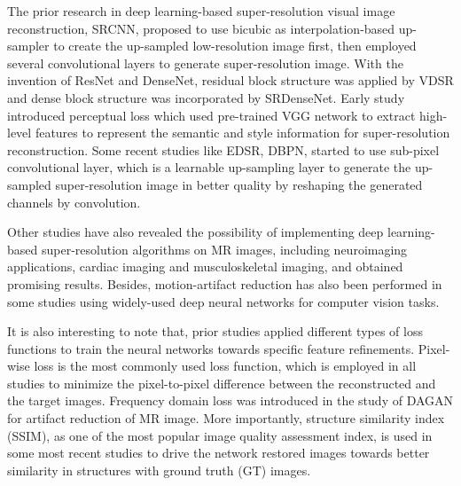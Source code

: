 \documentclass[runningheads]{llncs}
\begin{document}
The prior research in deep learning-based super-resolution visual image reconstruction, SRCNN\cite{ref_srcnn}, proposed to use bicubic as interpolation-based up-sampler to create the up-sampled low-resolution image first, then employed several convolutional layers to generate super-resolution image. With the invention of ResNet\cite{ref_resnet} and DenseNet\cite{ref_densenet}, residual block structure was applied by VDSR\cite{ref_vdsr} and dense block structure was incorporated by SRDenseNet\cite{ref_srdensenet}. Early study\cite{ref_perceptual_loss} introduced perceptual loss which used pre-trained VGG network to extract high-level features to represent the semantic and style information for super-resolution reconstruction. Some recent studies like EDSR\cite{ref_edsr}, DBPN\cite{ref_dbpn}, started to use sub-pixel convolutional layer\cite{ref_sub_pixel_conv}, which is a learnable up-sampling layer to generate the up-sampled super-resolution image in better quality by reshaping the generated channels by convolution.

Other studies have also revealed the possibility of implementing deep learning-based super-resolution algorithms on MR images, including neuroimaging applications\cite{ref_neuro_app}\cite{ref_neuro_app3}\cite{ref_neuro_app2}\cite{ref_neuro_app4}, cardiac imaging\cite{ref_cardio_app} and musculoskeletal imaging\cite{ref_mus_app}, and obtained promising results. Besides, motion-artifact reduction has also been performed in some studies using widely-used deep neural networks for computer vision tasks\cite{ref_mar1}\cite{ref_mar2}. 

It is also interesting to note that, prior studies applied different types of loss functions to train the neural networks towards specific feature refinements. Pixel-wise loss is the most commonly used loss function, which is employed in all studies to minimize the pixel-to-pixel difference between the reconstructed and the target images\cite{ref_neuro_app}\cite{ref_cardio_app}. Frequency domain loss was introduced in the study of DAGAN for artifact reduction of MR image\cite{ref_kspace}. More importantly, structure similarity index (SSIM)\cite{ref_ssim}, as one of the most popular image quality assessment index, is used in some most recent studies to drive the network restored images towards better similarity in structures with ground truth (GT) images\cite{ref_cardio_app}. 
\end{document}
